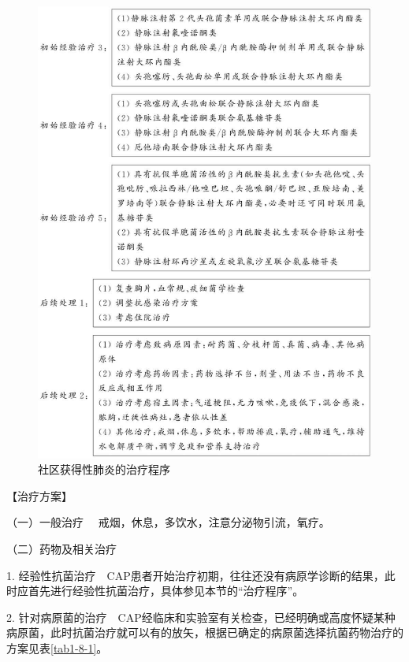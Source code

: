 \begin{figure}[!htbp]
\begin{minipage}[b]{0.49\textwidth}
  \includegraphics{./images/Image00016.jpg}
\end{minipage}
\captionsetup{justification=centering}
\caption{社区获得性肺炎的治疗程序}
\label{fig1-8-1a}
\end{figure} 

【治疗方案】

{（一）一般治疗} 　戒烟，休息，多饮水，注意分泌物引流，氧疗。

{（二）药物及相关治疗}

1.
经验性抗菌治疗　CAP患者开始治疗初期，往往还没有病原学诊断的结果，此时应首先进行经验性抗菌治疗，具体参见本节的“治疗程序”。

2.
针对病原菌的治疗　CAP经临床和实验室有关检查，已经明确或高度怀疑某种病原菌，此时抗菌治疗就可以有的放矢，根据已确定的病原菌选择抗菌药物治疗的方案见表\ref{tab1-8-1}。


